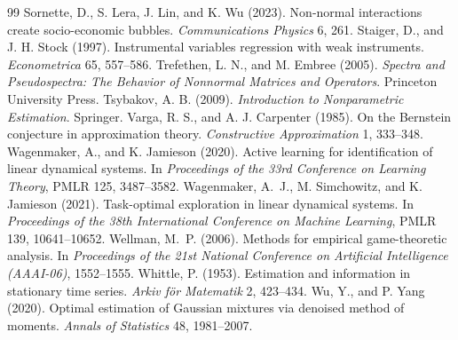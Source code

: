 \documentclass[12pt]{article}
\theoremstyle{definition}
\theoremstyle{remark}
\begin{document}
\begin{thebibliography}{99}
 Sornette, D., S. Lera, J. Lin, and K. Wu (2023). Non-normal interactions create socio-economic bubbles. \emph{Communications Physics} 6, 261.
 Staiger, D., and J. H. Stock (1997). Instrumental variables regression with weak instruments. \emph{Econometrica} 65, 557--586.
 Trefethen, L. N., and M. Embree (2005). \emph{Spectra and Pseudospectra: The Behavior of Nonnormal Matrices and Operators}. Princeton University Press.
 Tsybakov, A. B. (2009). \emph{Introduction to Nonparametric Estimation}. Springer.
 Varga, R. S., and A. J. Carpenter (1985). On the Bernstein conjecture in approximation theory. \emph{Constructive Approximation} 1, 333--348.
 Wagenmaker, A., and K. Jamieson (2020). Active learning for identification of linear dynamical systems. In \emph{Proceedings of the 33rd Conference on Learning Theory}, PMLR 125, 3487--3582.
 Wagenmaker, A.~J., M. Simchowitz, and K. Jamieson (2021). Task-optimal exploration in linear dynamical systems. In \emph{Proceedings of the 38th International Conference on Machine Learning}, PMLR 139, 10641--10652.
 Wellman, M.~P. (2006). Methods for empirical game-theoretic analysis. In \emph{Proceedings of the 21st National Conference on Artificial Intelligence (AAAI-06)}, 1552--1555.
 Whittle, P. (1953). Estimation and information in stationary time series. \emph{Arkiv f\"or Matematik} 2, 423--434.
 Wu, Y., and P. Yang (2020). Optimal estimation of Gaussian mixtures via denoised method of moments. \emph{Annals of Statistics} 48, 1981--2007.
\end{thebibliography}
\end{document}
